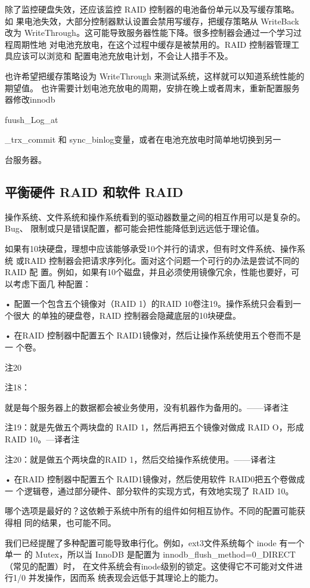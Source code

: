 除了监控硬盘失效，还应该监控 RAID 控制器的电池备份单元以及写缓存策略。如
果电池失效，大部分控制器默认设置会禁用写缓存，把缓存策略从 WriteBack 改为
WriteThrough。这可能导致服务器性能下降。很多控制器会通过一个学习过程周期性地
对电池充放电，在这个过程中缓存是被禁用的。RAID 控制器管理工具应该可以浏览和
配置电池充放电计划，不会让人措手不及。

也许希望把缓存策略设为 WriteThrough 来测试系统，这样就可以知道系统性能的期望值。
也许需要计划电池充放电的周期，安排在晚上或者周末，重新配置服务器修改innodb

fuush\_Log\_at

\_trx\_commit 和 sync\_binlog变量，或者在电池充放电时简单地切换到另一

台服务器。

\subsection{平衡硬件 RAID 和软件 RAID}
操作系统、文件系统和操作系统看到的驱动器数量之间的相互作用可以是复杂的。Bug、
限制或只是错误配置，都可能会把性能降低到远远低于理论值。

如果有10块硬盘，理想中应该能够承受10个并行的请求，但有时文件系统、操作系统
或RAID 控制器会把请求序列化。面对这个问题一个可行的办法是尝试不同的RAID 配
置。例如，如果有10个磁盘，并且必须使用镜像冗余，性能也要好，可以考虑下面几
种配置：

• 配置一个包含五个镜像对（RAID 1）的RAID 10卷注19。操作系统只会看到一个很大
的单独的硬盘卷，RAID 控制器会隐藏底层的10块硬盘。

• 在RAID 控制器中配置五个 RAID1镜像对，然后让操作系统使用五个卷而不是一
个卷。

注20

注18：

就是每个服务器上的数据都会被业务使用，没有机器作为备用的。——译者注

注19：就是先做五个两块盘的 RAID 1，然后再把五个镜像对做成 RAID O，形成 RAID 10。—译者注

注20：就是做五个两块盘的RAID 1，然后交给操作系统使用。——译者注

• 在RAID 控制器中配置五个 RAID1镜像对，然后使用软件 RAID0把五个卷做成一
个逻辑卷，通过部分硬件、部分软件的实现方式，有效地实现了 RAID 10。

哪个选项是最好的？这依赖于系统中所有的组件如何相互协作。不同的配置可能获得相
同的结果，也可能不同。

我们已经提醒了多种配置可能导致串行化。例如，ext3文件系统每个 inode 有一个单一
的 Mutex，所以当 InnoDB 是配置为 innodb\_flush\_method=0\_DIRECT（常见的配置）时，
在文件系统会有inode级别的锁定。这使得它不可能对文件进行1/0 并发操作，因而系
统表现会远低于其理论上的能力。

